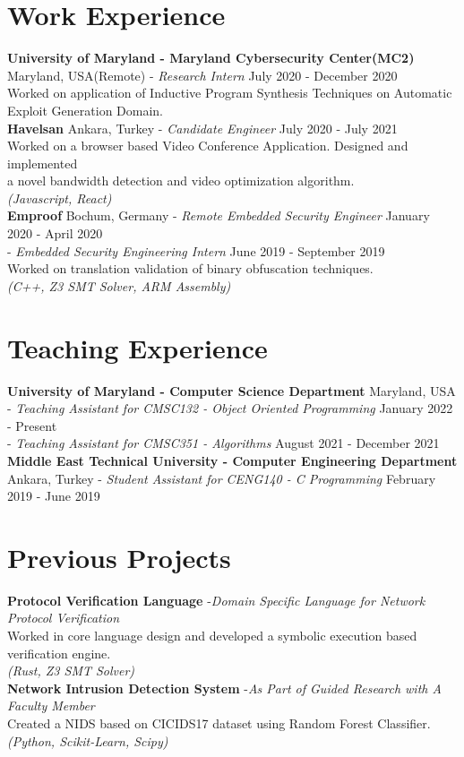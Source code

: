 \documentclass[letter]{res}
\newcommand{\secsplit}{\vspace{-2mm}}
\newcommand{\itemsplit}{\\[3mm]}
\newcommand{\RNum}[1]{\uppercase\expandafter{\romannumeral #1\relax}}
\begin{document}
\begin{resume}
\section{Work Experience}
\secsplit
\textbf{University of Maryland - Maryland Cybersecurity Center(MC2)} \hfill Maryland, USA(Remote) \newline
- {\sl Research Intern} \hfill July 2020 - December 2020\\
Worked on application of Inductive Program Synthesis Techniques on Automatic \\ Exploit Generation Domain.
\itemsplit
\textbf{Havelsan} \hfill Ankara, Turkey \newline
- {\sl Candidate Engineer} \hfill July 2020 - July 2021\\
Worked on a browser based Video Conference Application. Designed and implemented \\ a novel bandwidth detection and video optimization algorithm. \\
\textit{(Javascript, React)}
\itemsplit
\textbf{Emproof} \hfill Bochum, Germany \newline
- {\sl Remote Embedded Security Engineer} \hfill January 2020 - April 2020\\
- {\sl Embedded Security Engineering Intern} \hfill June 2019 - September 2019\\
Worked on translation validation of binary obfuscation techniques. \\
\textit{(C++, Z3 SMT Solver, ARM Assembly)}
 \secsplit
 \section{Teaching Experience}
 \secsplit
\textbf{University of Maryland - Computer Science Department} \hfill Maryland, USA\newline
- {\sl Teaching Assistant for CMSC132 - Object Oriented Programming \RNum{2}} \hfill January 2022 - Present\\
- {\sl Teaching Assistant for CMSC351 - Algorithms} \hfill August 2021 - December 2021
\itemsplit
\textbf{Middle East Technical University - Computer Engineering Department} \hfill Ankara, Turkey \newline
- {\sl Student Assistant for CENG140 - C Programming} \hfill February 2019 - June 2019
\secsplit
\section{Previous Projects}
\secsplit
\textbf{Protocol Verification Language} \newline 
-{\sl Domain Specific Language for Network Protocol Verification} \\
Worked in core language design and developed a symbolic execution based verification engine.\\
\textit{(Rust, Z3 SMT Solver)}
\itemsplit
\textbf{Network Intrusion Detection System } \newline
-{\sl As Part of Guided Research with A Faculty Member} \\
Created a NIDS based on CICIDS17 dataset using Random Forest Classifier.\\
\textit{(Python, Scikit-Learn, Scipy)}
\end{resume}
\end{document}
